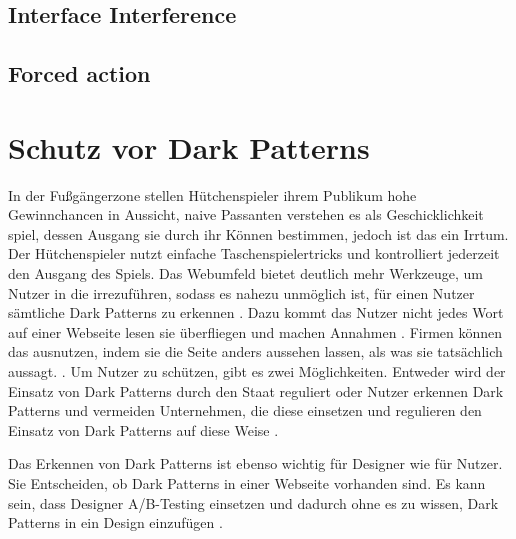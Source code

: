\documentclass[conference,compsoc,final,a4paper]{IEEEtran}
\begin{document}
\subsection{Interface Interference}
\subsection{Forced action}


\section{Schutz vor Dark Patterns}

In der Fußgängerzone stellen Hütchenspieler ihrem Publikum hohe Gewinnchancen in Aussicht, naive Passanten verstehen es als Geschicklichkeit spiel, dessen Ausgang sie durch ihr Können bestimmen, jedoch ist das ein Irrtum. Der Hütchenspieler nutzt einfache Taschenspielertricks und kontrolliert jederzeit den Ausgang des Spiels. Das Webumfeld bietet deutlich mehr Werkzeuge, um Nutzer in die irrezuführen, sodass es nahezu unmöglich ist, für einen Nutzer sämtliche Dark Patterns zu erkennen \autocite{M.Bhoot2020}. Dazu kommt das Nutzer nicht jedes Wort auf einer Webseite lesen sie überfliegen und machen Annahmen \autocite{Brignull}. Firmen können das ausnutzen, indem sie die Seite anders aussehen lassen, als was sie tatsächlich aussagt. \autocite{Brignull}. Um Nutzer zu schützen, gibt es zwei Möglichkeiten. Entweder wird der Einsatz von Dark Patterns durch den Staat reguliert oder Nutzer erkennen Dark Patterns und vermeiden Unternehmen, die diese einsetzen und regulieren den Einsatz von Dark Patterns auf diese Weise \autocite{Narayanan2020}.

Das Erkennen von Dark Patterns ist ebenso wichtig für Designer wie für Nutzer. Sie Entscheiden, ob Dark Patterns in einer Webseite vorhanden sind. Es kann sein, dass Designer A/B-Testing einsetzen und dadurch ohne es zu wissen, Dark Patterns in ein Design einzufügen \autocite{Narayanan2020}.

\end{document}
